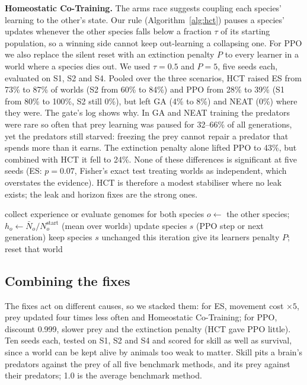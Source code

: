 \documentclass[conference]{IEEEtran}
\begin{document}
\textbf{Homeostatic Co-Training.} The arms race suggests coupling each species' learning to the other's state. Our rule (Algorithm~\ref{alg:hct}) pauses a species' updates whenever the other species falls below a fraction $\tau$ of its starting population, so a winning side cannot keep out-learning a collapsing one. For PPO we also replace the silent reset with an extinction penalty $P$ to every learner in a world where a species dies out. We used $\tau=0.5$ and $P=5$, five seeds each, evaluated on S1, S2 and S4. Pooled over the three scenarios, HCT raised ES from 73\% to 87\% of worlds (S2 from 60\% to 84\%) and PPO from 28\% to 39\% (S1 from 80\% to 100\%, S2 still 0\%), but left GA (4\% to 8\%) and NEAT (0\%) where they were. The gate's log shows why. In GA and NEAT training the predators were rare so often that prey learning was paused for 32--66\% of all generations, yet the predators still starved: freezing the prey cannot repair a predator that spends more than it earns. The extinction penalty alone lifted PPO to 43\%, but combined with HCT it fell to 24\%. None of these differences is significant at five seeds (ES: $p=0.07$, Fisher's exact test treating worlds as independent, which overstates the evidence). HCT is therefore a modest stabiliser where no leak exists; the leak and horizon fixes are the strong ones.

\begin{algorithm}[t]
\caption{Homeostatic Co-Training (one iteration)}
\label{alg:hct}
\begin{algorithmic}[1]
\State collect experience or evaluate genomes for both species
  \State $o \gets$ the other species; $h_o \gets \bar{N}_o / N_o^{\text{start}}$ (mean over worlds)
   update species $s$ (PPO step or next generation)
  \Else{} keep species $s$ unchanged this iteration
  \EndIf
\EndFor
{} give its learners penalty $P$; reset that world \EndIf
\end{algorithmic}
\end{algorithm}

\subsection{Combining the fixes}
\label{sec:combined}
The fixes act on different causes, so we stacked them: for ES, movement cost $\times5$, prey updated four times less often and Homeostatic Co-Training; for PPO, discount 0.999, slower prey and the extinction penalty (HCT gave PPO little). Ten seeds each, tested on S1, S2 and S4 and scored for skill as well as survival, since a world can be kept alive by animals too weak to matter. Skill pits a brain's predators against the prey of all five benchmark methods, and its prey against their predators; 1.0 is the average benchmark method.
\end{document}
